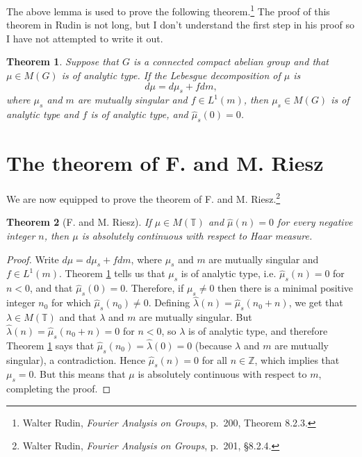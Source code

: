 \documentclass{article}
\newtheorem{theorem}{Theorem}
\begin{document}
The above lemma is used to prove the following theorem.\footnote{Walter
Rudin, {\em Fourier Analysis on Groups}, p.~200, Theorem 8.2.3.} The proof of this theorem in Rudin is not long, but I don't understand the first
step in his proof so I have not attempted to write it out.

\begin{theorem}
Suppose that $G$ is a connected compact abelian group and that $\mu \in M(G)$
is of analytic type. If the Lebesgue decomposition of $\mu$ is
\[
d\mu = d\mu_s + fdm,
\]
where $\mu_s$ and $m$ are mutually singular and $f \in L^1(m)$, then
$\mu_s \in M(G)$ is of analytic type and $f$ is of analytic type, and $\hat{\mu}_s(0)=0$. 
\label{823} 
\end{theorem}



\section{The theorem of F. and M. Riesz}
We are now equipped to prove the theorem of F. and M. Riesz.\footnote{Walter Rudin, {\em Fourier Analysis on Groups},
p.~201, \S 8.2.4.}


\begin{theorem}[F. and M. Riesz]
If $\mu \in M(\mathbb{T})$ and
$\hat{\mu}(n)=0$ for every negative integer $n$,
then $\mu$ is absolutely continuous with respect to Haar measure.
\end{theorem}
\begin{proof}
Write  $d\mu=d\mu_s + fdm$, where $\mu_s$ and $m$ are mutually singular and $f \in L^1(m)$. Theorem \ref{823}
tells us that $\mu_s$ is of analytic type, i.e. $\hat{\mu}_s(n)=0$ for $n<0$, and that $\hat{\mu}_s(0)=0$. Therefore,
if $\mu_s \neq 0$ then there is a minimal positive integer $n_0$ for which $\hat{\mu}_s(n_0) \neq 0$. Defining
$\hat{\lambda}(n)=\hat{\mu}_s(n_0+n)$, we get that $\lambda \in M(\mathbb{T})$ and that $\lambda$ and $m$ are mutually singular. But
$\hat{\lambda}(n)=\hat{\mu}_s(n_0+n)=0$ for $n<0$, so $\lambda$ is of analytic type, and therefore
 Theorem \ref{823} says that $\hat{\mu}_s(n_0)=\hat{\lambda}(0)=0$ (because $\lambda$ and $m$ are mutually singular), a contradiction. Hence
 $\hat{\mu}_s(n) = 0$ for all $n \in \mathbb{Z}$, which implies that $\mu_s=0$. But this means that $\mu$ is absolutely continuous with respect to $m$, completing the proof.
\end{proof}
\end{document}

